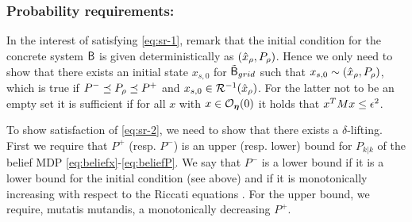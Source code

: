 \documentclass{ifacconf}
\begin{document}
\subsubsection{Probability requirements:}

In the interest of satisfying \eqref{eq:sr-1}, remark that the initial condition for the concrete system $\mathsf{B}$ is given deterministically as $(\hat x_\rho, P_\rho)$. Hence we only need to show that there exists an initial state $x_{s,0}$ for $\tilde {\mathsf{B}}_{grid}$ such that $x_{s,0} \sim (\hat x_\rho, P_\rho)$, which is true if  $P^-\preceq  P_\rho \preceq P^+$ and $x_{s,0}\in \mathcal{R}^{-1}( \hat x_\rho )$. For the latter not to be an empty set it is sufficient if for all $x$ with $x \in \mathcal{O}_{\boldsymbol{\eta}}(0)$ it holds that $x^T M x \leq \epsilon^2$.
 
To show satisfaction of \eqref{eq:sr-2}, we need to show that there exists a $\delta$-lifting. First we require that $P^+$ (resp. $P^-$) is an upper (resp. lower) bound for $P_{k|k}$ of the belief MDP \eqref{eq:beliefx}-\eqref{eq:beliefP}.  We say that $P^-$ is a lower bound if it is a lower bound for the initial condition (see above) and   if it is monotonically increasing with respect to the Riccati equations \citep{bitmead1985monotonicity}. For the upper bound, we require, mutatis mutandis, a monotonically decreasing $P^+$. 
\end{document}

